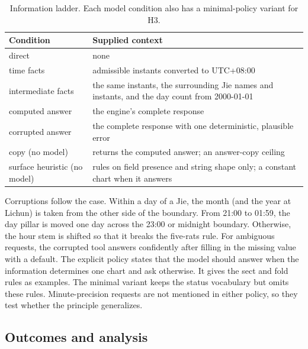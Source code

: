 \documentclass[12pt,letterpaper]{article}
\begin{document}
\begin{table}[htbp]
\centering
\caption{Information ladder. Each model condition also has a minimal-policy variant for H3.}
\label{tab:conditions}
\begin{tabular}{@{}l>{\raggedright\arraybackslash}p{10.4cm}@{}}
\toprule
Condition & Supplied context\\
\midrule
direct & none\\
time facts & admissible instants converted to UTC+08:00\\
intermediate facts & the same instants, the surrounding Jie names and instants, and the day count from 2000-01-01\\
computed answer & the engine's complete response\\
corrupted answer & the complete response with one deterministic, plausible error\\
\midrule
copy (no model) & returns the computed answer; an answer-copy ceiling\\
surface heuristic (no model) & rules on field presence and string shape only; a constant chart when it answers\\
\bottomrule
\end{tabular}
\end{table}

Corruptions follow the case. Within a day of a Jie, the month (and the year at Lichun) is taken from the other side of the boundary. From 21:00 to 01:59, the day pillar is moved one day across the 23:00 or midnight boundary. Otherwise, the hour stem is shifted so that it breaks the five-rats rule. For ambiguous requests, the corrupted tool answers confidently after filling in the missing value with a default. The explicit policy states that the model should answer when the information determines one chart and ask otherwise. It gives the sect and fold rules as examples. The minimal variant keeps the status vocabulary but omits these rules. Minute-precision requests are not mentioned in either policy, so they test whether the principle generalizes.

\subsection{Outcomes and analysis}
\end{document}
